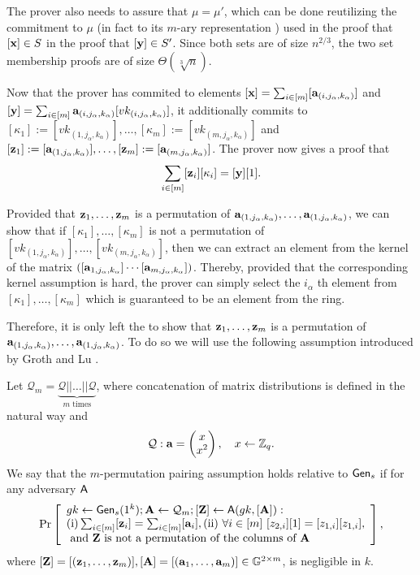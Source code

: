The prover also needs to assure that $\mu=\mu'$, which can be done reutilizing the commitment to $\mu$ (in fact to its $m$-ary representation ) used in the proof that $[\mathbf{x}]\in S$ in the proof that $[\mathbf{y}]\in S'$. Since both sets are of size $n^{2/3}$, the two set membership proofs are of size $\Theta(\sqrt[3]{n})$.
 
Now that the prover has commited to elements $[\mathbf{x}]=\sum_{i\in[m]}[\mathbf{a}_{(i,j_\alpha,k_\alpha)}]$ and $[\mathbf{y}]=\sum_{i\in[m]}\mathbf{a}_{(i,j_\alpha,k_\alpha)}[vk_{(i,j_\alpha,k_\alpha)}]$, it additionally commits to $[\kappa_1]:=[vk_{(1,j_\alpha,k_\alpha)}],\allowbreak\ldots,\allowbreak[\kappa_m]:=[vk_{(m,j_\alpha,k_\alpha)}]$ and $[\mathbf{z}_1]:=[\mathbf{a}_{(1,j_\alpha,k_\alpha)}],\ldots,[\mathbf{z}_m]:=[\mathbf{a}_{(m,j_\alpha,k_\alpha)}]$. The prover now gives a proof that
\begin{equation}
\sum_{i\in[m]}[\mathbf{z}_i][\kappa_i]=[\mathbf{y}][1]. \label{eq:verif1}
\end{equation}

Provided that $\mathbf{z}_1,\ldots,\mathbf{z}_m$ is a permutation of $\mathbf{a}_{(1,j_\alpha,k_\alpha)},\ldots,\mathbf{a}_{(1,j_\alpha,k_\alpha)}$,
we can show that if $[\kappa_1],\ldots,[\kappa_m]$ is not a permutation of $[vk_{(1,j_\alpha,k_\alpha)}],\allowbreak\ldots,\allowbreak[vk_{(m,j_\alpha,k_\alpha)}]$, then we can extract an element from the kernel of the matrix $([\mathbf{a}_{1,j_\alpha,k_\alpha}]\cdots\allowbreak [\mathbf{a}_{m,j_\alpha,k_\alpha}])$. Thereby, provided that the corresponding kernel assumption is hard, the prover can simply select the $i_\alpha$ th element from $[\kappa_1],\ldots,\allowbreak [\kappa_m]$ which is guaranteed to be an element from the ring.

Therefore, it is only left the to show that $\mathbf{z}_1,\ldots,\mathbf{z}_m$ is a permutation of $\mathbf{a}_{(1,j_\alpha,k_\alpha)},\ldots,\mathbf{a}_{(1,j_\alpha,k_\alpha)}$. To do so we will use the following assumption introduced by Groth and Lu \cite{AC:GroLu07}.
\begin{definition}
Let $\mathcal{Q}_{m}=\underbrace{\mathcal{Q}||\ldots||\mathcal{Q}}_{m\text{ times}}$, where concatenation of matrix distributions is defined in the natural way and 
$$\mathcal{Q}: \mathbf{a}=\left(\begin{matrix}x\\x^2\end{matrix}\right),\quad x\gets\mathbb{Z}_q.$$
We say that the $m$-permutation pairing assumption holds relative to $\mathsf{Gen}_s$ if for any adversary $\mathsf{A}$
$$
\Pr\left[
\begin{array}{l}
gk\gets\mathsf{Gen}_s(1^k);\mathbf{{A}}\gets\mathcal{Q}_{m};[\mathbf{{Z}}]\gets\mathsf{A}(gk,[\mathbf{{A}}]):\\
\mathrm{(i)} \sum_{i\in[m]}[\mathbf{z}_i]=\sum_{i\in[m]}[\mathbf{a}_i], \mathrm{(ii)}\ \forall i\in[m]\ [z_{2,i}][1]=[z_{1,i}][z_{1,i}],\\
\text{ and }\mathbf{{Z}}\text{ is not a permutation of the columns of }\mathbf{{A}}
\end{array}
\right],
$$
where $[\mathbf{{Z}}]=[(\mathbf{z}_1,\ldots,\mathbf{z}_m)],[\mathbf{A}]=[(\mathbf{a}_1,\ldots,\mathbf{a}_m)]\in\mathbb{G}^{2\times m}$,
is negligible in $k$.
\end{definition}

